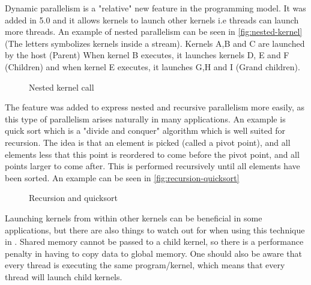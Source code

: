 Dynamic parallelism is a "relative" new feature in the \cuda{} programming model.
It was added in \cuda{} 5.0 and it allows kernels to launch other kernels i.e threads can launch more threads.
An example of nested parallelism can be seen in \autoref{fig:nested-kernel} (The letters symbolizes kernels inside a \cuda{} stream).
Kernels A,B and C are launched by the host (Parent)
When kernel B executes, it launches kernels D, E and F (Children) and when kernel E executes, it launches G,H and I (Grand children).
\begin{figure}[ht]
	\centering
	\caption{Nested kernel call}
	\label{fig:nested-kernel}
\end{figure}
The feature was added to express nested and recursive parallelism more easily, as this type of parallelism arises naturally in many applications.
An example is quick sort which is a "divide and conquer" algorithm which is well suited for recursion.
The idea is that an element is picked (called a pivot point), and all elements less that this point is reordered to come before the pivot point, and all points larger to come after.
This is performed recursively until all elements have been sorted.
An example can be seen in \autoref{fig:recursion-quicksort}
\begin{figure}[ht]
	\centering
	\caption{Recursion and quicksort}
	\label{fig:recursion-quicksort}
\end{figure}

Launching kernels from within other kernels can be beneficial in some applications, but there are also things to watch out for when using this technique in \cuda{}.
Shared memory cannot be passed to a child kernel, so there is a performance penalty in having to copy data to global memory.
One should also be aware that every thread is executing the same program/kernel, which means that every thread will launch child kernels.